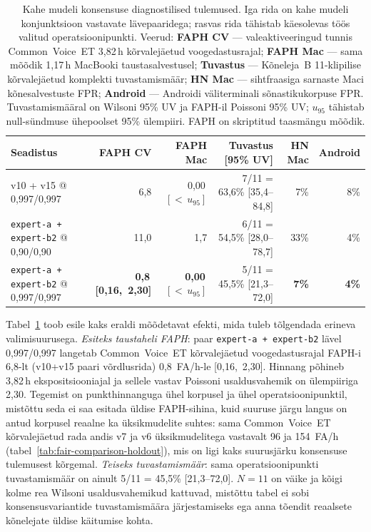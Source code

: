 \begin{table}[H]
\centering
\caption{Kahe mudeli konsensuse diagnostilised tulemused. Iga rida on kahe mudeli konjunktsioon vastavate lävepaaridega; rasvas rida tähistab käesolevas töös valitud operatsioonipunkti. Veerud: \textbf{FAPH CV} --- valeaktiveeringud tunnis Common~Voice~ET 3,82\,h kõrvalejäetud voogedastusrajal; \textbf{FAPH Mac} --- sama mõõdik 1,17\,h MacBooki taustasalvestusel; \textbf{Tuvastus} --- Kõneleja~B 11-klipilise kõrvalejäetud komplekti tuvastamismäär; \textbf{HN Mac} --- sihtfraasiga sarnaste Maci kõnesalvestuste FPR; \textbf{Android} --- Androidi väliterminali sõnastikukorpuse FPR. Tuvastamismääral on Wilsoni 95\% UV ja FAPH-il Poissoni 95\% UV; $u_{95}$ tähistab null-sündmuse ühepoolset 95\% ülempiiri. FAPH on skriptitud taasmängu mõõdik.}
\label{tab:expert-consensus}
\scriptsize
\begin{tabular}{l r r r r r}
\hline
\textbf{Seadistus} & \textbf{FAPH CV} & \textbf{FAPH Mac} & \textbf{Tuvastus [95\% UV]} & \textbf{HN Mac} & \textbf{Android} \\
\hline
v10 + v15 @ 0,997/0,997 & 6,8 & 0,00\,$[<{\,}u_{95}]$ & 7/11 = 63,6\% [35,4--84,8] & 7\% & 8\% \\
\texttt{expert-a + expert-b2} @ 0,90/0,90 & 11,0 & 1,7 & 6/11 = 54,5\% [28,0--78,7] & 33\% & 4\% \\
\texttt{expert-a + expert-b2} @ 0,997/0,997 & \textbf{0,8\,[0,16,~2,30]} & \textbf{0,00\,$[<{\,}u_{95}]$} & 5/11 = 45,5\% [21,3--72,0] & \textbf{7\%} & \textbf{4\%} \\
\hline
\end{tabular}
\end{table}

Tabel~\ref{tab:expert-consensus} toob esile kaks eraldi mõõdetavat efekti, mida tuleb tõlgendada erineva valimisuurusega. \emph{Esiteks taustaheli FAPH}: paar \texttt{expert-a + expert-b2} lävel 0,997/0,997 langetab Common~Voice~ET kõrvalejäetud voogedastusrajal FAPH-i 6,8-lt (v10+v15 paari võrdlusrida) 0,8~FA/h-le [0,16,~2,30]. Hinnang põhineb 3,82\,h ekspositsiooniajal ja sellele vastav Poissoni usaldusvahemik on ülempiiriga 2,30. Tegemist on punkthinnanguga ühel korpusel ja ühel operatsioonipunktil, mistõttu seda ei saa esitada üldise FAPH-sihina, kuid suuruse järgu langus on antud korpusel reaalne ka üksikmudelite suhtes: sama Common~Voice~ET kõrvalejäetud rada andis v7 ja v6 üksikmudelitega vastavalt 96 ja 154~FA/h (tabel~\ref{tab:fair-comparison-holdout}), mis on ligi kaks suurusjärku konsensuse tulemusest kõrgemal. \emph{Teiseks tuvastamismäär}: sama operatsioonipunkti tuvastamismäär on ainult 5/11 = 45,5\% [21,3--72,0]. $N=11$ on väike ja kõigi kolme rea Wilsoni usaldusvahemikud kattuvad, mistõttu tabel ei sobi konsensusvariantide tuvastamismäära järjestamiseks ega anna tõendit reaalsete kõnelejate üldise käitumise kohta.

